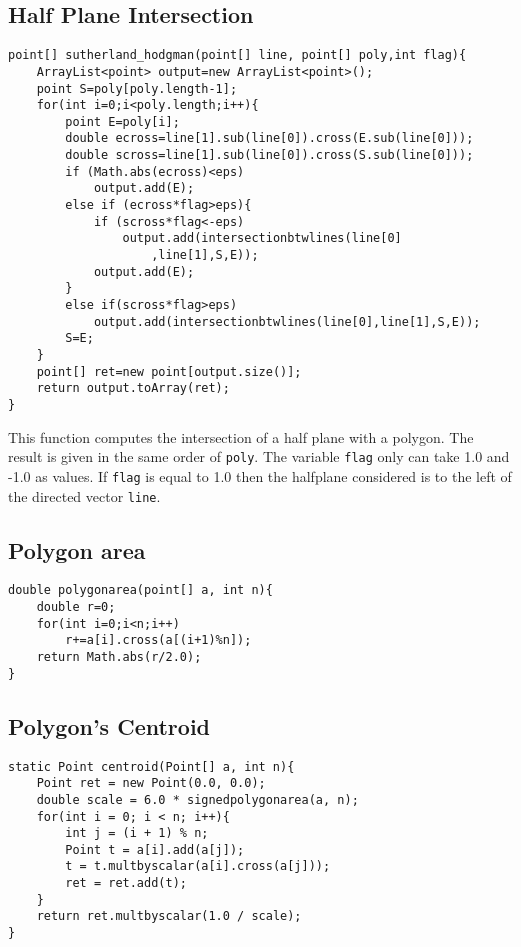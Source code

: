\documentclass[10pt,letterpaper,twocolumn,twosided]{article}
\begin{document}
\subsection{Half Plane Intersection}

\begin{lstlisting}
point[] sutherland_hodgman(point[] line, point[] poly,int flag){
    ArrayList<point> output=new ArrayList<point>();
    point S=poly[poly.length-1];
    for(int i=0;i<poly.length;i++){
        point E=poly[i];
        double ecross=line[1].sub(line[0]).cross(E.sub(line[0]));
        double scross=line[1].sub(line[0]).cross(S.sub(line[0]));
        if (Math.abs(ecross)<eps)
            output.add(E);
        else if (ecross*flag>eps){
            if (scross*flag<-eps)
                output.add(intersectionbtwlines(line[0]
                    ,line[1],S,E));
            output.add(E);
        }
        else if(scross*flag>eps)
            output.add(intersectionbtwlines(line[0],line[1],S,E));
        S=E;
    }
    point[] ret=new point[output.size()];
    return output.toArray(ret);
}
\end{lstlisting}

This function computes the intersection of a half plane with a polygon. The result is given in the same order of \verb+poly+. The variable \verb+flag+ only can take 1.0 and -1.0 as values. If \verb+flag+ is equal to 1.0 then the halfplane considered is to the left of the directed vector \verb+line+.

\subsection{Polygon area}

\begin{lstlisting}
double polygonarea(point[] a, int n){
    double r=0;
    for(int i=0;i<n;i++)
        r+=a[i].cross(a[(i+1)%n]);
    return Math.abs(r/2.0);
}
\end{lstlisting}

\subsection{Polygon's Centroid}

\begin{lstlisting}
static Point centroid(Point[] a, int n){
    Point ret = new Point(0.0, 0.0);
    double scale = 6.0 * signedpolygonarea(a, n);
    for(int i = 0; i < n; i++){
        int j = (i + 1) % n;
        Point t = a[i].add(a[j]);
        t = t.multbyscalar(a[i].cross(a[j]));
        ret = ret.add(t);
    }
    return ret.multbyscalar(1.0 / scale);
}
\end{lstlisting}
\end{document}
